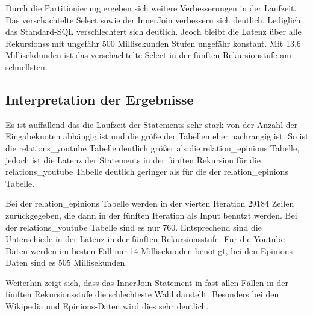 Durch die Partitionierung ergeben sich weitere Verbesserungen in der Laufzeit. Das verschachtelte Select sowie der InnerJoin verbessern sich deutlich. Lediglich das Standard-SQL verschlechtert sich deutlich. Jeoch bleibt die Latenz über alle Rekursionss mit ungefähr 500 Millisekunden Stufen ungefähr konstant.  Mit 13.6 Millisekdunden ist das verschachtelte Select in der fünften Rekursionstufe am schnellsten.   


\subsection{Interpretation der Ergebnisse}

Es ist auffallend das die Laufzeit der Statements sehr stark von der Anzahl der Eingabeknoten abhängig ist und die größe der Tabellen eher nachrangig ist. So ist die relations\_youtube Tabelle deutlich größer als die relation\_epinions Tabelle, jedoch ist die Latenz der Statements in der fünften Rekursion für die relations\_youtube Tabelle deutlich geringer als für die der relation\_epinions Tabelle.  

Bei der relation\_epinions Tabelle werden in der vierten Iteration 29184 Zeilen zurückgegeben, die dann in der fünften Iteration als Input benutzt werden. Bei der relations\_youtube Tabelle sind es nur 760. Entsprechend sind die Unterschiede in der Latenz in der fünften Rekursionsstufe. Für die Youtube-Daten werden im besten Fall nur 14 Millisekunden benötigt, bei den Epinions-Daten sind es 505 Millisekunden.

Weiterhin zeigt sich, dass das InnerJoin-Statement in fast allen Fällen in der fünften Rekursionsstufe die schlechteste Wahl darstellt. Besonders bei den Wikipedia und Epinions-Daten wird dies sehr deutlich.

